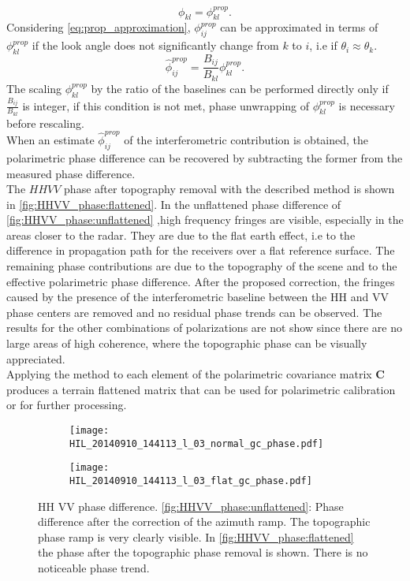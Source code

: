 \begin{equation}
	\phi_{kl} = \phi_{kl}^{prop}.
\end{equation}
Considering \autoref{eq:prop_approximation}, $\phi_{ij}^{prop}$ can be approximated in terms of $\phi_{kl}^{prop}$ if the look angle does not significantly change from $k$ to $i$, i.e if $\theta_{i} \approx \theta_{k}$. 
\begin{equation}
	\hat{\phi}_{ij}^{prop} = \frac{B_{ij}}{B_{kl}} \phi_{kl}^{prop}.
\end{equation}
The scaling $\phi_{kl}^{prop}$ by the ratio of the baselines can be performed directly only if $\frac{B_{ij}}{B_{kl}}$ is integer\cite{Massonnet1996}, if this condition is not met, phase unwrapping of $\phi_{kl}^{prop}$ is necessary before rescaling.\\
When an estimate $\hat{\phi}_{ij}^{prop}$ of the interferometric contribution is obtained, the polarimetric phase difference can be recovered by subtracting the former from the measured phase difference.\\
The $HHVV$ phase after topography removal with the described method  is shown in \autoref{fig:HHVV_phase:flattened}. In the unflattened phase difference of \autoref{fig:HHVV_phase:unflattened} ,high frequency fringes are visible, especially in the areas closer to the radar. They are due to the flat earth effect, i.e to the difference in propagation path for the receivers over a flat reference surface. The remaining phase contributions are due to the topography of the scene and to the effective polarimetric phase difference.
After the proposed correction, the fringes caused by the presence of the interferometric baseline between the HH and VV phase centers are removed and no residual phase trends can be observed. The results for the other combinations of polarizations are not show since there are no large areas of high coherence, where the topographic phase can be visually appreciated.\\
Applying the method to each element of the polarimetric covariance matrix $\mathbf{C}$ produces a terrain flattened matrix that can be used for polarimetric calibration or for further processing. 
\begin{figure}[ht]
	\centering
	\begin{subfigure}[b]{\columnwidth}
		\centering
		\texttt{[image: HIL\_20140910\_144113\_l\_03\_normal\_gc\_phase.pdf]}
		\label{fig:HHVV_phase:unflattened}
	\end{subfigure}
	\begin{subfigure}[b]{\columnwidth}
		\centering
		\texttt{[image: HIL\_20140910\_144113\_l\_03\_flat\_gc\_phase.pdf]}
		\label{fig:HHVV_phase:flattened}
	\end{subfigure}
	\caption{HH VV phase difference. \autoref{fig:HHVV_phase:unflattened}: Phase difference after the correction of the azimuth ramp. The topographic phase ramp is very clearly visible. In  \autoref{fig:HHVV_phase:flattened} the phase after the topographic phase removal is shown. There is no noticeable phase trend.}
	\label{fig:HHVV_phase}
\end{figure}
\FloatBarrier

